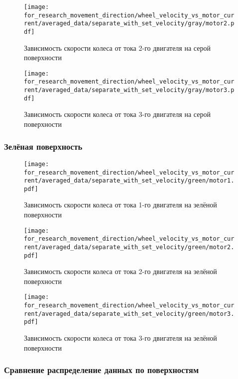 \begin{figure}[H]
    \centering
    \texttt{[image: for\_research\_movement\_direction/wheel\_velocity\_vs\_motor\_current/averaged\_data/separate\_with\_set\_velocity/gray/motor2.pdf]}
    \caption{Зависимость скорости колеса от тока 2-го двигателя на серой поверхности}
\end{figure}

\begin{figure}[H]
    \centering
    \texttt{[image: for\_research\_movement\_direction/wheel\_velocity\_vs\_motor\_current/averaged\_data/separate\_with\_set\_velocity/gray/motor3.pdf]}
    \caption{Зависимость скорости колеса от тока 3-го двигателя на серой поверхности}
\end{figure}

\subsubsection{Зелёная поверхность}

\begin{figure}[H]
    \centering
    \texttt{[image: for\_research\_movement\_direction/wheel\_velocity\_vs\_motor\_current/averaged\_data/separate\_with\_set\_velocity/green/motor1.pdf]}
    \caption{Зависимость скорости колеса от тока 1-го двигателя на зелёной поверхности}
\end{figure}

\begin{figure}[H]
    \centering
    \texttt{[image: for\_research\_movement\_direction/wheel\_velocity\_vs\_motor\_current/averaged\_data/separate\_with\_set\_velocity/green/motor2.pdf]}
    \caption{Зависимость скорости колеса от тока 2-го двигателя на зелёной поверхности}
\end{figure}

\begin{figure}[H]
    \centering
    \texttt{[image: for\_research\_movement\_direction/wheel\_velocity\_vs\_motor\_current/averaged\_data/separate\_with\_set\_velocity/green/motor3.pdf]}
    \caption{Зависимость скорости колеса от тока 3-го двигателя на зелёной поверхности}
\end{figure}

\subsubsection{Сравнение распределение данных по поверхностям}

